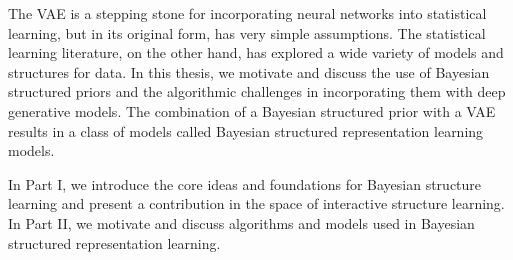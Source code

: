 The VAE is a stepping stone
for incorporating
neural networks into
statistical learning,
but in its original form,
has very simple assumptions.
The statistical learning literature,
on the other hand, has
explored a wide variety of
models and structures for data.
In this thesis, we 
motivate and discuss
the use of Bayesian structured priors
and the algorithmic challenges
in incorporating them
with deep generative models.
The combination
of a Bayesian structured
prior with a VAE
results
in a class of models called
Bayesian structured representation learning
models.

In Part I, we introduce the
core ideas and foundations for Bayesian structure
learning and present a contribution
in the space of interactive structure learning.
In Part II, we motivate and discuss
algorithms and models used in Bayesian structured
representation learning.
